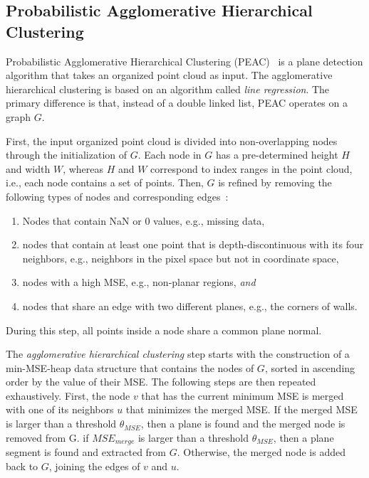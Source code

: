 \documentclass[main.tex]{subfiles}
\begin{document}
\subsection{Probabilistic Agglomerative Hierarchical Clustering}
\label{subsec:bg-peac}
Probabilistic Agglomerative Hierarchical Clustering (PEAC)~\cite{Feng_Taguchi_Kamat_2014} is a plane detection algorithm that takes an organized
point cloud as input.
The agglomerative hierarchical clustering is based on an algorithm called
\textit{line regression}\cite[Section~III.B]{Nguyen_Martinelli_Tomatis_Siegwart_2005}. The primary difference is
that, instead of a double linked list, PEAC operates on a graph $G$.

First, the input organized point cloud is divided into non-overlapping nodes through the initialization of $G$.
Each node in $G$ has a pre-determined height $H$ and width $W$, whereas $H$ and $W$ correspond to index ranges in the
point cloud, i.e., each node contains a set of points.
Then, $G$ is refined by removing the following types of nodes and corresponding edges~\cite[Section~III.A]{Feng_Taguchi_Kamat_2014}:
\begin{enumerate}
    \item Nodes that contain NaN or 0 values, e.g., missing data,
    \item nodes that contain at least one point that is depth-discontinuous with its four neighbors, e.g., neighbors
          in the pixel space but not in coordinate space,
    \item nodes with a high MSE, e.g., non-planar regions, \textit{and}
    \item nodes that share an edge with two different planes, e.g., the corners of walls.
\end{enumerate}
During this step, all points inside a node share a common plane normal.

The \textit{agglomerative hierarchical clustering} step starts with the construction of a min-MSE-heap data
structure that contains the nodes of $G$, sorted in ascending order by the value of their MSE.
The following steps are then repeated exhaustively.
First, the node $v$ that has the current minimum MSE is merged with one of its neighbors $u$ that minimizes the merged MSE.
If the merged MSE is larger than a threshold $\theta_{MSE}$, then a plane is found and the merged node is removed from G.
if $MSE_{merge}$ is larger than a threshold $\theta_{MSE}$, then a plane segment is found and extracted from $G$.
Otherwise, the merged node is added back to $G$, joining the edges of $v$ and $u$.
\end{document}
